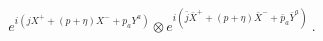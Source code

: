 \begin{equation}
e^{i(jX^++(p+\eta)X^-+ p_aY^a)}\otimes 
e^{i(\bar{j}\bar{X}^++(p+\eta)\bar{X}^-+ \bar{p}_a\bar{Y}^a)} ~.
\end{equation}

